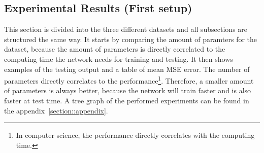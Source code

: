  \subsection{Experimental Results (First setup)} \label{subsection::exp_results}
  This section is divided into the three different datasets and all subsections are structured the same way. It starts by comparing the amount of paramters
  for the dataset, because the amount of parameters is directly correlated to the computing time the network needs for training and testing. It then shows
  examples of the testing output and a table of mean MSE error.
  The number of parameters directly correlates to the performance\footnote{In computer science, the performance directly correlates with the computing time.}.
  Therefore, a smaller amount of parameters is always better, because the network will train faster and is also faster at test time. A tree graph of the performed 
  experiments can be found in the appendix~\ref{section::appendix}.
  
